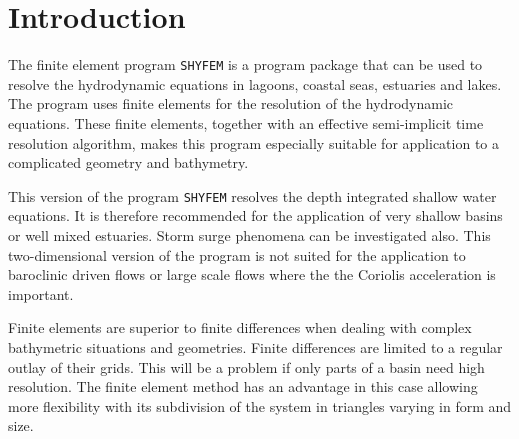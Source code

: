 \documentclass{report}
\newcommand{\shy}{{\tt SHYFEM}}
\begin{document}
\begin{comment}

\chapter*{Availability}
\addcontentsline{toc}{chapter}{Availability}


The library \shy{} is available free of charge bye anonymous ftp.
Connect to
|ftp.isdgm.ve.cnr.it| and look in the directory |/pub/|\shy{}.
Please read the README file of the distribution. Only source code
is available.

The model should compile out of the box for nearly all Unix-like
systems. Please follow the instructions in the README file.

Please send bug reports to the author (|georg@lagoon.isdgm.ve.cnr.it|).

\end{comment}


\newpage











\chapter{Introduction}


The finite element program \shy{} is a program package that can be used
to resolve the hydrodynamic equations in lagoons, coastal seas,
estuaries and lakes. The program uses finite elements for the
resolution of the hydrodynamic equations. These finite elements,
together with an effective semi-implicit time resolution algorithm,
makes this program especially suitable for application to a complicated
geometry and bathymetry.

This version of the program \shy{} resolves the depth integrated
shallow water equations. It is therefore recommended for the
application of very shallow basins or well mixed estuaries. Storm surge
phenomena can be investigated also.  This two-dimensional version of
the program is not suited for the application to baroclinic driven
flows or large scale flows where the the Coriolis acceleration is
important.

Finite elements are superior to finite differences when dealing with
complex bathymetric situations and geometries. Finite differences are
limited to a regular outlay of their grids. This will be a problem if
only parts of a basin need high resolution.  The finite element method
has an advantage in this case allowing more flexibility with its
subdivision of the system in triangles varying in form and size.
\end{document}
